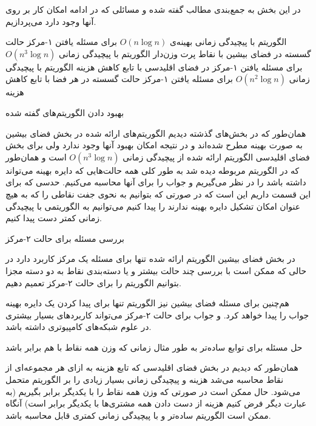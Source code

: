 

در این بخش به جمع‌بندی مطالب گفته شده و مسائلی که در ادامه امکان کار بر روی آنها وجود دارد می‌پردازیم.


الگوریتم با پیچیدگی زمانی بهینه‌ی 
$O(n\log n)$
برای مسئله یافتن ۱-مرکز حالت گسسته در فضای بیشین با نقاط پرت وزن‌دار
الگوریتم با پیچیدگی زمانی
$O(n^3\log n)$
برای مسئله یافتن ۱-مرکز در فضای اقلیدسی با تابع کاهش هزینه
الگوریتم با پیچیدگی زمانی
$O(n^2\log n)$
برای مسئله یافتن ۱-مرکز حالت گسسته در هر فضا با تابع کاهش هزینه




\item 
بهبود دادن الگوریتم‌های گفته شده

همان‌طور که در بخش‌های گذشته دیدیم الگوریتم‌های ارائه شده در بخش فضای بیشین به صورت بهینه مطرح شده‌اند و در نتیجه امکان بهبود آنها وجود ندارد ولی برای بخش فضای اقلیدسی الگوریتم ارائه شده از پیچیدگی زمانی 
$O(n^3\log n)$
است و همان‌طور که در الگوریتم مربوطه دیده شد به طور کلی همه حالت‌هایی که دایره بهینه می‌تواند داشته باشد را در نظر می‌گیریم و جواب را برای‌ آنها محاسبه می‌کنیم. حدسی که برای این قسمت داریم این است که در صورتی که بتوانیم به نحوی جفت نقاطی را که به هیچ عنوان امکان تشکیل دایره بهینه ندارند را پیدا کنیم می‌توانیم به الگوریتمی با پیچیدگی زمانی کمتر دست پیدا کنیم.
\item بررسی مسئله برای حالت ۲-مرکز

در بخش‌ فضای بیشین الگوریتم ارائه شده تنها برای مسئله یک مرکز کاربرد دارد در حالی که ممکن است با بررسی چند حالت بیشتر و یا دسته‌بندی نقاط به دو دسته مجزا بتوانیم الگوریتم را برای حالت ۲-مرکز تعمیم دهیم.

هم‌چنین برای مسئله فضای بیشین نیز الگوریتم تنها برای پیدا کردن یک دایره بهینه جواب را پیدا خواهد کرد. و جواب برای حالت ۲-مرکز می‌تواند کاربرد‌های بسیار بیشتری در علوم شبکه‌های کامپیوتری داشته باشد.
\item حل مسئله برای توابع ساده‌تر به طور مثال زمانی که وزن همه نقاط با هم برابر باشد

همان‌طور که دیدیم در بخش فضای اقلیدسی که تابع هزینه به ازای هر مجموعه‌ای از نقاط محاسبه می‌شد هزینه و پیچیدگی زمانی بسیار زیادی را بر الگوریتم متحمل می‌شود. حال ممکن است در صورتی که وزن همه نقاط را با یکدیگر برابر بگیریم (به عبارت دیگر فرض کنیم هزینه از دست دادن همه مشتری‌ها با یکدیگر برابر است) آنگاه ممکن است الگوریتم ساده‌تر و با پیچیدگی زمانی کمتری قابل محاسبه باشد.

